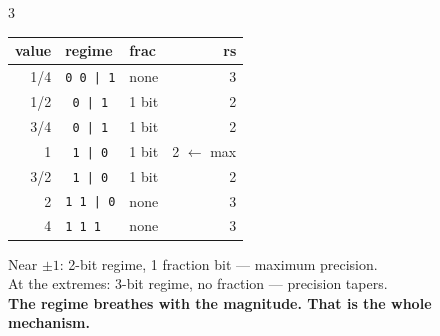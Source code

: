 \documentclass[10pt]{article}
\begin{document}
\begin{multicols}{3}
\begin{center}
\small
\begin{tabular}{rllr}
\toprule
value & regime & frac & rs \\
\midrule
 1/4 & \texttt{0 0 | 1} & none & 3 \\
 1/2 & \texttt{  0 | 1} & 1 bit & 2 \\
 3/4 & \texttt{  0 | 1} & 1 bit & 2 \\
  1  & \texttt{  1 | 0} & 1 bit & 2 $\leftarrow$ max \\
 3/2 & \texttt{  1 | 0} & 1 bit & 2 \\
  2  & \texttt{1 1 | 0} & none & 3 \\
  4  & \texttt{1 1   1} & none & 3 \\
\bottomrule
\end{tabular}
\end{center}

Near $\pm 1$: 2-bit regime, 1 fraction bit --- maximum precision.\\
At the extremes: 3-bit regime, no fraction --- precision tapers.\\
\textbf{The regime breathes with the magnitude. That is the whole mechanism.}

\end{multicols}
\end{document}
